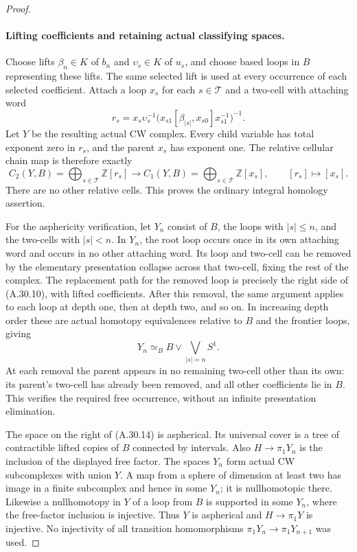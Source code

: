 \begin{proof}
\paragraph{Lifting coefficients and retaining actual classifying spaces.}
Choose lifts $\beta_n\in K$ of $b_n$ and
$\upsilon_s\in K$ of $u_s$, and choose based loops in
$B$ representing these lifts. The same selected lift is
used at every occurrence of each selected coefficient.
Attach a loop $x_s$ for each $s\in\mathcal T$ and a
two-cell with attaching word
\[
 r_s=x_s\upsilon_s^{-1}
 \bigl(x_{s1}[\beta_{|s|},x_{s0}]x_{s1}^{-1}\bigr)^{-1}.
 \tag{A.30.12}
\]
Let $Y$ be the resulting actual CW complex. Every child
variable has total exponent zero in $r_s$, and the parent
$x_s$ has exponent one. The relative cellular chain map is
therefore exactly
\[
 C_2(Y,B)=\bigoplus_{s\in\mathcal T}\mathbb Z[r_s]
 \longrightarrow
 C_1(Y,B)=\bigoplus_{s\in\mathcal T}\mathbb Z[x_s],
 \qquad [r_s]\longmapsto[x_s].
 \tag{A.30.13}
\]
There are no other relative cells. This proves the ordinary
integral homology assertion.

For the asphericity verification, let $Y_n$ consist of $B$,
the loops with $|s|\leq n$, and the two-cells with $|s|<n$.
In $Y_n$, the root loop occurs once in its own attaching
word and occurs in no other attaching word. Its loop and
two-cell can be removed by the elementary presentation
collapse across that two-cell, fixing the rest of the
complex. The replacement path for the removed loop is
precisely the right side of (A.30.10), with lifted
coefficients. After this removal, the same argument applies
to each loop at depth one, then at depth two, and so on.
In increasing depth order these are actual homotopy
equivalences relative to $B$ and the frontier loops, giving
\[
 Y_n\simeq_B B\vee\bigvee_{|s|=n}S^1.
 \tag{A.30.14}
\]
At each removal the parent appears in no remaining
two-cell other than its own: its parent's two-cell has
already been removed, and all other coefficients lie in
$B$. This verifies the required free occurrence, without
an infinite presentation elimination.

The space on the right of (A.30.14) is aspherical. Its
universal cover is a tree of contractible lifted copies
of $B$ connected by intervals. Also $H\to\pi_1Y_n$ is
the inclusion of the displayed free factor. The spaces
$Y_n$ form actual CW subcomplexes with union $Y$.
A map from a sphere of dimension at least two has image
in a finite subcomplex and hence in some $Y_n$; it is
nullhomotopic there. Likewise a nullhomotopy in $Y$ of a
loop from $B$ is supported in some $Y_n$, where the
free-factor inclusion is injective. Thus $Y$ is
aspherical and $H\to\pi_1Y$ is injective. No injectivity
of all transition homomorphisms $\pi_1Y_n\to\pi_1Y_{n+1}$
was used.


\end{proof}

